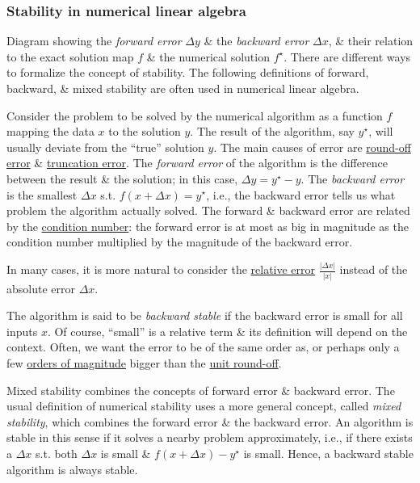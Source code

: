 \documentclass{article}
\begin{document}
\subsubsection{Stability in numerical linear algebra}
{\sf Diagram showing the {\it forward error} $\Delta y$ \& the {\it backward error} $\Delta x$, \& their relation to the exact solution map $f$ \& the numerical solution $f^\star$.} There are different ways to formalize the concept of stability. The following definitions of forward, backward, \& mixed stability are often used in numerical linear algebra.

Consider the problem to be solved by the numerical algorithm as a function $f$ mapping the data $x$ to the solution $y$. The result of the algorithm, say $y^\star$, will usually deviate from the ``true'' solution $y$. The main causes of error are \href{https://en.wikipedia.org/wiki/Round-off_error}{round-off error} \& \href{https://en.wikipedia.org/wiki/Truncation_error}{truncation error}. The {\it forward error} of the algorithm is the difference between the result \& the solution; in this case, $\Delta y = y^\star - y$. The {\it backward error} is the smallest $\Delta x$ s.t. $f(x + \Delta x) = y^\star$, i.e., the backward error tells us what problem the algorithm actually solved. The forward \& backward error are related by the \href{https://en.wikipedia.org/wiki/Condition_number}{condition number}: the forward error is at most as big in magnitude as the condition number multiplied by the magnitude of the backward error.

In many cases, it is more natural to consider the \href{https://en.wikipedia.org/wiki/Relative_error}{relative error} $\frac{|\Delta x|}{|x|}$ instead of the absolute error $\Delta x$.

The algorithm is said to be {\it backward stable} if the backward error is small for all inputs $x$. Of course, ``small'' is a relative term \& its definition will depend on the context. Often, we want the error to be of the same order as, or perhaps only a few \href{https://en.wikipedia.org/wiki/Orders_of_magnitude}{orders of magnitude} bigger than the \href{https://en.wikipedia.org/wiki/Unit_round-off}{unit round-off}.

{\sf Mixed stability combines the concepts of forward error \& backward error.} The usual definition of numerical stability uses a more general concept, called {\it mixed stability}, which combines the forward error \& the backward error. An algorithm is stable in this sense if it solves a nearby problem approximately, i.e., if there exists a $\Delta x$ s.t. both $\Delta x$ is small \& $f(x + \Delta x) - y^\star$ is small. Hence, a backward stable algorithm is always stable.
\end{document}
